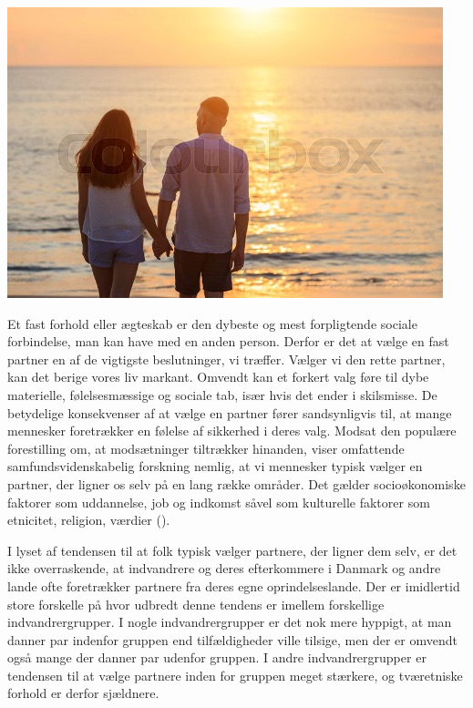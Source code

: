 \documentclass[
]{book}
\begin{document}
\includegraphics[width=1\linewidth]{images/kap2}

\newpage

Et fast forhold eller ægteskab er den dybeste og mest forpligtende sociale forbindelse, man kan have med en anden person. Derfor er det at vælge en fast partner en af de vigtigste beslutninger, vi træffer. Vælger vi den rette partner, kan det berige vores liv markant. Omvendt kan et forkert valg føre til dybe materielle, følelsesmæssige og sociale tab, især hvis det ender i skilsmisse. De betydelige konsekvenser af at vælge en partner fører sandsynligvis til, at mange mennesker foretrækker en følelse af sikkerhed i deres valg. Modsat den populære forestilling om, at modsætninger tiltrækker hinanden, viser omfattende samfundsvidenskabelig forskning nemlig, at vi mennesker typisk vælger en partner, der ligner os selv på en lang række områder. Det gælder socioøkonomiske faktorer som uddannelse, job og indkomst såvel som kulturelle faktorer som etnicitet, religion, værdier ().

I lyset af tendensen til at folk typisk vælger partnere, der ligner dem selv, er det ikke overraskende, at indvandrere og deres efterkommere i Danmark og andre lande ofte foretrækker partnere fra deres egne oprindelseslande. Der er imidlertid store forskelle på hvor udbredt denne tendens er imellem forskellige indvandrergrupper. I nogle indvandrergrupper er det nok mere hyppigt, at man danner par indenfor gruppen end tilfældigheder ville tilsige, men der er omvendt også mange der danner par udenfor gruppen. I andre indvandrergrupper er tendensen til at vælge partnere inden for gruppen meget stærkere, og tværetniske forhold er derfor sjældnere.
\end{document}
